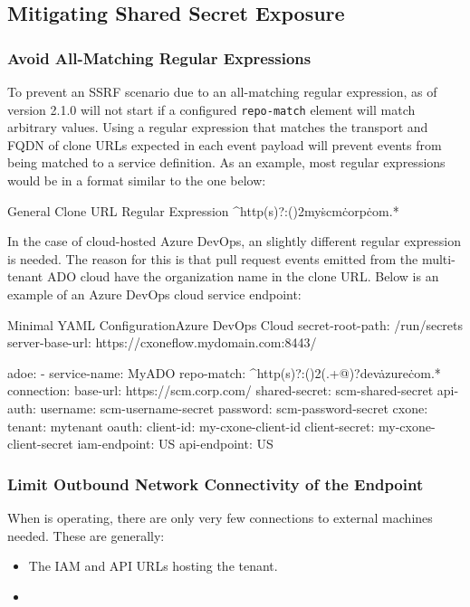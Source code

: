 \subsection{Mitigating Shared Secret Exposure}


\subsubsection{Avoid All-Matching Regular Expressions}

To prevent an SSRF scenario due to an all-matching regular expression, 
\cxoneflow as of version 2.1.0 will not start if a configured \texttt{repo-match} element
will match arbitrary values. Using a regular expression that matches the transport and FQDN
of clone URLs expected in each event payload will prevent events from being matched to a 
service definition.  As an example, most regular expressions would be in a format similar to the one below:

\begin{code}{General Clone URL Regular Expression}{}{}
^http(s)?:(\/){2}my\.scm\.corp\.com.*
\end{code}

In the case of cloud-hosted Azure DevOps, an slightly different regular expression
is needed.  The reason for this is that pull request events emitted from the multi-tenant ADO cloud have
the organization name in the clone URL.  Below is an example of an Azure DevOps cloud
service endpoint:

\begin{code}{Minimal YAML Configuration}{Azure DevOps Cloud}{}
  secret-root-path: /run/secrets
  server-base-url: https://cxoneflow.mydomain.com:8443/
  
  adoe:
      - service-name: MyADO
        repo-match: ^http(s)?:(\/){2}(.+@)?dev\.azure\.com.*
        connection:
        base-url: https://scm.corp.com/
        shared-secret: scm-shared-secret
        api-auth:
          username: scm-username-secret
          password: scm-password-secret
        cxone:
          tenant: mytenant
          oauth:
            client-id: my-cxone-client-id
            client-secret: my-cxone-client-secret
          iam-endpoint: US
          api-endpoint: US
\end{code}
  
\subsubsection{Limit Outbound Network Connectivity of the \cxoneflowtext\space Endpoint}

When \cxoneflow is operating, there are only very few connections to external machines
needed.  These are generally:

\begin{itemize}
  \item The IAM and API URLs hosting the \cxone tenant.
  \item 
\end{itemize}